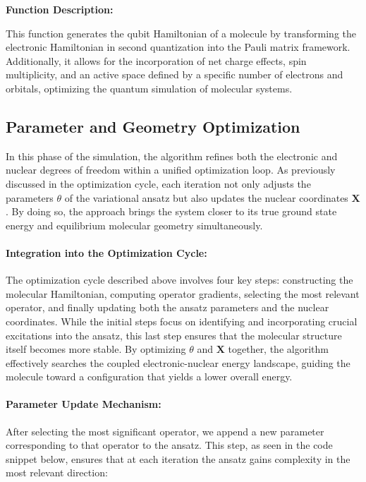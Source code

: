 \begin{enumerate}
    \textbf{Function Description:}
    
    This function generates the qubit Hamiltonian of a molecule by transforming the electronic Hamiltonian in second quantization into the Pauli matrix framework. Additionally, it allows for the incorporation of net charge effects, spin multiplicity, and an active space defined by a specific number of electrons and orbitals, optimizing the quantum simulation of molecular systems.
    
\end{enumerate}
\subsection{Parameter and Geometry Optimization}

In this phase of the simulation, the algorithm refines both the electronic and nuclear degrees of freedom within a unified optimization loop. As previously discussed in the optimization cycle, each iteration not only adjusts the parameters \(\theta\) of the variational ansatz but also updates the nuclear coordinates \(\mathbf{X}\). By doing so, the approach brings the system closer to its true ground state energy and equilibrium molecular geometry simultaneously.

\paragraph{Integration into the Optimization Cycle:}  
The optimization cycle described above involves four key steps: constructing the molecular Hamiltonian, computing operator gradients, selecting the most relevant operator, and finally updating both the ansatz parameters and the nuclear coordinates. While the initial steps focus on identifying and incorporating crucial excitations into the ansatz, this last step ensures that the molecular structure itself becomes more stable. By optimizing \(\theta\) and \(\mathbf{X}\) together, the algorithm effectively searches the coupled electronic-nuclear energy landscape, guiding the molecule toward a configuration that yields a lower overall energy.

\paragraph{Parameter Update Mechanism:}  
After selecting the most significant operator, we append a new parameter corresponding to that operator to the ansatz. This step, as seen in the code snippet below, ensures that at each iteration the ansatz gains complexity in the most relevant direction:

